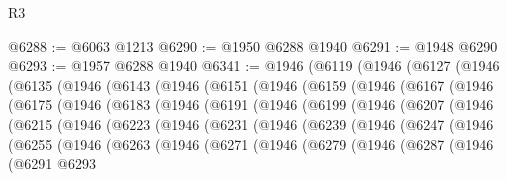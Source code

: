 \begin{lexlean}{R3}
\begin{coremodule}
@6288 := @6063 @1213
@6290 := @1950 @6288 @1940
@6291 := @1948 @6290
@6293 := @1957 @6288 @1940
@6341 := @1946
    (@6119
      (@1946
        (@6127
          (@1946
            (@6135
              (@1946
                (@6143
                  (@1946
                    (@6151
                      (@1946
                        (@6159
                          (@1946
                            (@6167
                              (@1946
                                (@6175
                                  (@1946
                                    (@6183
                                      (@1946
                                        (@6191
                                          (@1946
                                            (@6199
                                              (@1946
                                                (@6207
                                                  (@1946
                                                    (@6215
                                                      (@1946
                                                        (@6223
                                                          (@1946
                                                            (@6231
                                                              (@1946
                                                                (@6239
                                                                  (@1946
                                                                    (@6247
                                                                      (@1946
                                                                        (@6255
                                                                          (@1946
                                                                            (@6263
                                                                              (@1946
                                                                                (@6271
                                                                                  (@1946
                                                                                    (@6279
                                                                                      (@1946
                                                                                        (@6287
                                                                                          (@1946
                                                                                            (@6291
                                                                                              @6293

\end{coremodule}
\end{lexlean}
